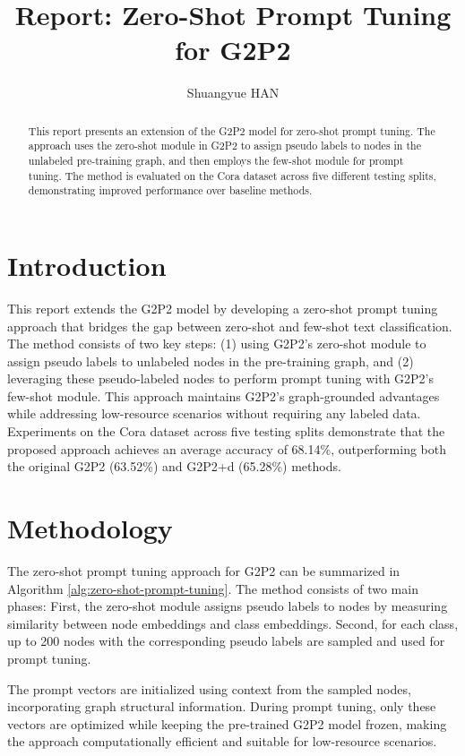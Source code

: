 \documentclass[10pt,conference]{IEEEtran}
\begin{document}
\title{Report: Zero-Shot Prompt Tuning for G2P2}
\author{Shuangyue HAN}
\maketitle

\begin{abstract}
This report presents an extension of the G2P2 model for zero-shot prompt tuning. The approach uses the zero-shot module in G2P2 to assign pseudo labels to nodes in the unlabeled pre-training graph, and then employs the few-shot module for prompt tuning. The method is evaluated on the Cora dataset across five different testing splits, demonstrating improved performance over baseline methods.
\end{abstract}

\section{Introduction}

This report extends the G2P2 model by developing a zero-shot prompt tuning approach that bridges the gap between zero-shot and few-shot text classification. The method consists of two key steps: (1) using G2P2's zero-shot module to assign pseudo labels to unlabeled nodes in the pre-training graph, and (2) leveraging these pseudo-labeled nodes to perform prompt tuning with G2P2's few-shot module. This approach maintains G2P2's graph-grounded advantages while addressing low-resource scenarios without requiring any labeled data. Experiments on the Cora dataset across five testing splits demonstrate that the proposed approach achieves an average accuracy of 68.14\%, outperforming both the original G2P2 (63.52\%) and G2P2+d (65.28\%) methods.

\section{Methodology}

The zero-shot prompt tuning approach for G2P2 can be summarized in Algorithm \ref{alg:zero-shot-prompt-tuning}. The method consists of two main phases: First, the zero-shot module assigns pseudo labels to nodes by measuring similarity between node embeddings and class embeddings. Second, for each class, up to 200 nodes with the corresponding pseudo labels are sampled and used for prompt tuning.

The prompt vectors are initialized using context from the sampled nodes, incorporating graph structural information. During prompt tuning, only these vectors are optimized while keeping the pre-trained G2P2 model frozen, making the approach computationally efficient and suitable for low-resource scenarios.
\end{document}
